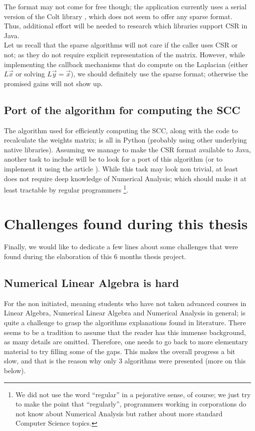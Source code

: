 The format may not come for free though; the application currently
uses a serial version of the Colt library \cite{colt}, which does not
seem to offer any sparse format. Thus, additional effort will be
needed to research which libraries support CSR in Java. \\

Let us recall that the sparse algorithms will not care if the caller uses
CSR or not; as they do not require explicit representation of the
matrix. However, while implementing the callback mechanisms that do
compute on the \gls{Laplacian} (either $L\vec{x}$ or solving $L\vec{y} =
\vec{x}$), we should definitely use the sparse format; otherwise the
promised gains will not show up.

\subsection{Port of the algorithm for computing the \gls{SCC}}

The algorithm used for efficiently computing the \gls{SCC}, along with the
code to recalculate the weights matrix; is all in Python (probably
using other underlying native libraries). Assuming we manage to make the CSR
format available to Java, another task to include will be to look for
a port of this algorithm (or to implement it using the article
\cite{pearce05}). While this task may look non trivial, at least does
not require deep knowledge of Numerical Analysis; which should make it
at least tractable by regular programmers \footnote{We did not use the
word ``regular'' in a pejorative sense, of course; we just try to make
the point that ``regularly'', programmers working in corporations do
not know about Numerical Analysis but rather about more standard
Computer Science topics.}.

\section{Challenges found during this thesis}

Finally, we would like to dedicate a few lines about some challenges
that were found during the elaboration of this 6 months thesis
project.

\subsection{Numerical Linear Algebra is hard}

For the non initiated, meaning students who have not taken advanced
courses in Linear Algebra,  Numerical Linear Algebra and Numerical
Analysis in general; is quite a challenge to grasp the algorithms
explanations found in literature. There seems to be a tradition to
assume that the reader has this immense background, as many details
are omitted. Therefore, one needs to go back to more elementary
material to try filling some of the gaps. This makes the overall
progress a bit slow, and that is the reason why only 3 algorithms were
presented (more on this below). \\


